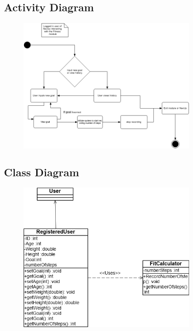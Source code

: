 \subsection{Activity Diagram}
\begin{figure}[H]
  \includegraphics[width=0.8\textwidth]{Fitness/FitnessActivitydiagram.png}
\end{figure}

\subsection{Class Diagram}
\begin{figure}[H]
  \includegraphics[width=0.8\textwidth]{Fitness/FitnessClassDgm.png}
\end{figure}
